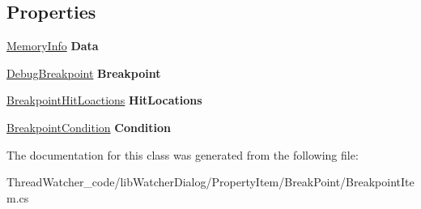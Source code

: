 \subsection*{Properties}
\begin{DoxyCompactItemize}
\item 
\hypertarget{classlib_watcher_dialog_1_1_property_item_1_1_break_point_1_1_breakpoint_item_abbc98f957d6dc2a25d235d5508de5c0a}{\hyperlink{classlib_wather_debugger_1_1_memory_1_1_memory_info}{Memory\+Info} {\bfseries Data}}\label{classlib_watcher_dialog_1_1_property_item_1_1_break_point_1_1_breakpoint_item_abbc98f957d6dc2a25d235d5508de5c0a}

\item 
\hypertarget{classlib_watcher_dialog_1_1_property_item_1_1_break_point_1_1_breakpoint_item_a57d8d10f845e27975ebb6fa73f782a52}{\hyperlink{classlib_wather_debugger_1_1_breakpoint_1_1_debug_breakpoint}{Debug\+Breakpoint} {\bfseries Breakpoint}}\label{classlib_watcher_dialog_1_1_property_item_1_1_break_point_1_1_breakpoint_item_a57d8d10f845e27975ebb6fa73f782a52}

\item 
\hypertarget{classlib_watcher_dialog_1_1_property_item_1_1_break_point_1_1_breakpoint_item_a4781c553b2e26d906b68ff7075d9f3b6}{\hyperlink{classlib_watcher_dialog_1_1_property_item_1_1_break_point_1_1_property_1_1_breakpoint_hit_loactions}{Breakpoint\+Hit\+Loactions} {\bfseries Hit\+Locations}}\label{classlib_watcher_dialog_1_1_property_item_1_1_break_point_1_1_breakpoint_item_a4781c553b2e26d906b68ff7075d9f3b6}

\item 
\hypertarget{classlib_watcher_dialog_1_1_property_item_1_1_break_point_1_1_breakpoint_item_aa225a1c37db109f6b910ae306f186d8e}{\hyperlink{classlib_watcher_dialog_1_1_property_item_1_1_break_point_1_1_property_1_1_breakpoint_thread_1_1_breakpoint_condition}{Breakpoint\+Condition} {\bfseries Condition}}\label{classlib_watcher_dialog_1_1_property_item_1_1_break_point_1_1_breakpoint_item_aa225a1c37db109f6b910ae306f186d8e}

\end{DoxyCompactItemize}


The documentation for this class was generated from the following file\+:\begin{DoxyCompactItemize}
\item 
Thread\+Watcher\+\_\+code/lib\+Watcher\+Dialog/\+Property\+Item/\+Break\+Point/Breakpoint\+Item.\+cs\end{DoxyCompactItemize}
